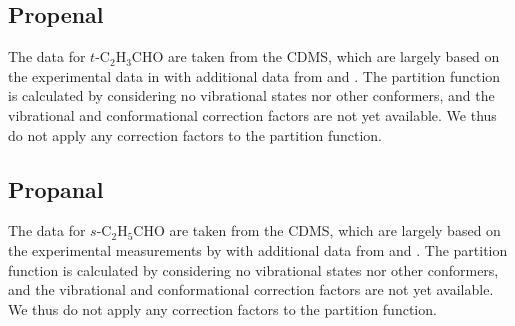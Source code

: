 \documentclass[linenumbers, twocolumn, twocolappendix, astrosymb, times]{aastex631}
\newcommand{\propenal}{$t$-C$_2$H$_3$CHO\xspace}
\newcommand{\propanal}{$s$-C$_2$H$_5$CHO\xspace}
\begin{document}
\subsection{Propenal}
The data for \propenal are taken from the CDMS, which are largely based on the experimental data in \citet{Daly2015} with additional data from \citet{Winnewisser1975} and \citet{Cherniak1966}. The partition function is calculated by considering no vibrational states nor other conformers, and the vibrational and conformational correction factors are not yet available. We thus do not apply any correction factors to the partition function.

\subsection{Propanal}
The data for \propanal are taken from the CDMS, which are largely based on the experimental measurements by \citet{Zingsheim2017} with additional data from \citet{Hardy1982} and \citet{Demaison1987}. The partition function is calculated by considering no vibrational states nor other conformers, and the vibrational and conformational correction factors are not yet available. We thus do not apply any correction factors to the partition function.









{}



\end{document}
